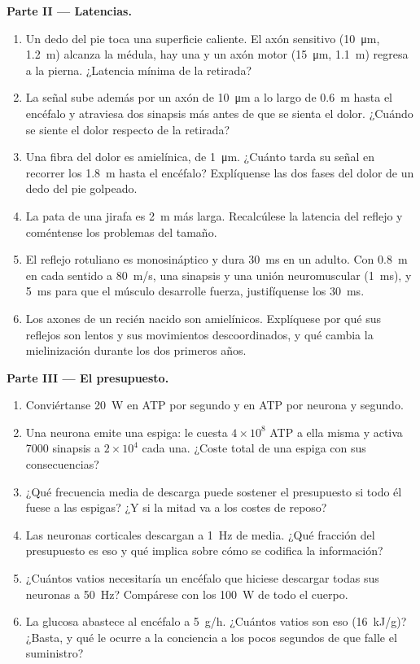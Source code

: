 \begin{problem}
\medskip
\noindent\textbf{Parte II --- Latencias.}
\begin{enumerate}[resume]
  \item Un dedo del pie toca una superficie caliente. El axón sensitivo
        (\qty{10}{\micro m}, \qty{1.2}{m}) alcanza la médula, hay una
         y un axón motor (\qty{15}{\micro m}, \qty{1.1}{m})
        regresa a la pierna. ¿Latencia mínima de la retirada?
  \item La señal sube además por un axón de \qty{10}{\micro m} a lo
        largo de \qty{0.6}{m} hasta el encéfalo y atraviesa dos
        sinapsis más antes de que se sienta el dolor. ¿Cuándo se siente
        el dolor respecto de la retirada?
  \item Una fibra del dolor es amielínica, de \qty{1}{\micro m}.
        ¿Cuánto tarda su señal en recorrer los \qty{1.8}{m} hasta el
        encéfalo? Explíquense las dos fases del dolor de un dedo del
        pie golpeado.
  \item La pata de una jirafa es \qty{2}{m} más larga. Recalcúlese la
        latencia del reflejo y coméntense los problemas del tamaño.
  \item El reflejo rotuliano es monosináptico y dura \qty{30}{ms} en un
        adulto. Con \qty{0.8}{m} en cada sentido a \qty{80}{m/s}, una
        sinapsis y una unión neuromuscular (\qty{1}{ms}), y \qty{5}{ms}
        para que el músculo desarrolle fuerza, justifíquense los
        \qty{30}{ms}.
  \item Los axones de un recién nacido son amielínicos. Explíquese por
        qué sus reflejos son lentos y sus movimientos descoordinados, y
        qué cambia la mielinización durante los dos primeros años.
\end{enumerate}

\medskip
\noindent\textbf{Parte III --- El presupuesto.}
\begin{enumerate}[resume]
  \item Conviértanse \qty{20}{W} en ATP por segundo y en ATP por
        neurona y segundo.
  \item Una neurona emite una espiga: le cuesta $4\times 10^{8}$ ATP a
        ella misma y activa \num{7000} sinapsis a $2\times 10^{4}$ cada
        una. ¿Coste total de una espiga con sus consecuencias?
  \item ¿Qué frecuencia media de descarga puede sostener el presupuesto
        si todo él fuese a las espigas? ¿Y si la mitad va a los costes
        de reposo?
  \item Las neuronas corticales descargan a \qty{1}{Hz} de media. ¿Qué
        fracción del presupuesto es eso y qué implica sobre cómo se
        codifica la información?
  \item ¿Cuántos vatios necesitaría un encéfalo que hiciese descargar
        todas sus neuronas a \qty{50}{Hz}? Compárese con los
        \qty{100}{W} de todo el cuerpo.
  \item La glucosa abastece al encéfalo a \qty{5}{g/h}. ¿Cuántos vatios
        son eso (\qty{16}{kJ/g})? ¿Basta, y qué le ocurre a la
        conciencia a los pocos segundos de que falle el suministro?
\end{enumerate}


\end{problem}
